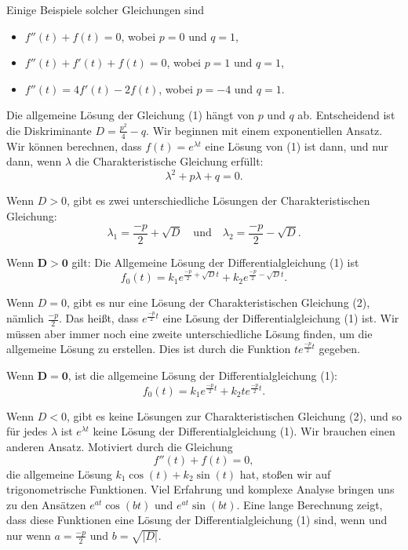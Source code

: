 \documentclass[11pt, openany]{book}
\begin{document}
Einige Beispiele solcher Gleichungen sind
\begin{itemize}
    \item $f''(t) + f(t) = 0$, wobei $p = 0$ und $q = 1$,
    \item $f''(t) + f'(t) + f(t) = 0$, wobei $p = 1$ und $q = 1$,
    \item $f''(t) = 4f'(t) - 2f(t)$, wobei $p = -4$ und $q = 1$.
\end{itemize}

Die allgemeine Lösung der Gleichung (1) hängt von $p$ und $q$ ab. Entscheidend ist die Diskriminante $D = \frac{p^2}{4} - q$.
Wir beginnen mit einem exponentiellen Ansatz. Wir können berechnen, dass $f(t) = e^{\lambda t}$ eine Lösung von (1) ist dann, und nur dann, wenn $\lambda$ die Charakteristische Gleichung erfüllt:
\begin{equation}
    \lambda^2 + p \lambda + q = 0. \tag{2}
\end{equation}

Wenn $D > 0$, gibt es zwei unterschiedliche Lösungen der Charakteristischen Gleichung:
\[
    \lambda_1 = \frac{-p}{2} + \sqrt{D} \quad \text{und} \quad \lambda_2 = \frac{-p}{2} - \sqrt{D}.
\]
\begin{tcolorbox}
    Wenn $\mathbf{D > 0}$ gilt: Die Allgemeine Lösung der Differentialgleichung (1) ist
    \[
        f_0(t) = k_1 e^{\frac{-p}{2} + \sqrt{D} t} + k_2 e^{\frac{-p}{2} - \sqrt{D} t}.
    \]
\end{tcolorbox}

Wenn $D = 0$, gibt es nur eine Lösung der Charakteristischen Gleichung (2), nämlich $\frac{-p}{2}$. Das heißt, dass $e^{\frac{-p}{2} t}$ eine Lösung der Differentialgleichung (1) ist. Wir müssen aber immer noch eine zweite unterschiedliche Lösung finden, um die allgemeine Lösung zu erstellen. Dies ist durch die Funktion $t e^{\frac{-p}{2} t}$ gegeben.

\begin{tcolorbox}
    Wenn $\mathbf{D = 0}$, ist die allgemeine Lösung der Differentialgleichung (1):
    \[
        f_0(t) = k_1 e^{\frac{-p}{2} t} + k_2 t e^{\frac{-p}{2} t}.
    \]
\end{tcolorbox}

Wenn $D < 0$, gibt es keine Lösungen zur Charakteristischen Gleichung (2), und so für jedes $\lambda$ ist $e^{\lambda t}$ keine Lösung der Differentialgleichung (1). Wir brauchen einen anderen Ansatz. Motiviert durch die Gleichung
\[
    f''(t) + f(t) = 0,
\]
die allgemeine Lösung $k_1 \cos(t) + k_2 \sin(t)$ hat, stoßen wir auf trigonometrische Funktionen. Viel Erfahrung und komplexe Analyse bringen uns zu den Ansätzen $e^{at}\cos(bt)$ und $e^{at} \sin(bt)$. Eine lange Berechnung zeigt, dass diese Funktionen eine Lösung der Differentialgleichung (1) sind, wenn und nur wenn $a = \frac{-p}{2}$ und $b = \sqrt{\lvert D \rvert}$.
\end{document}
